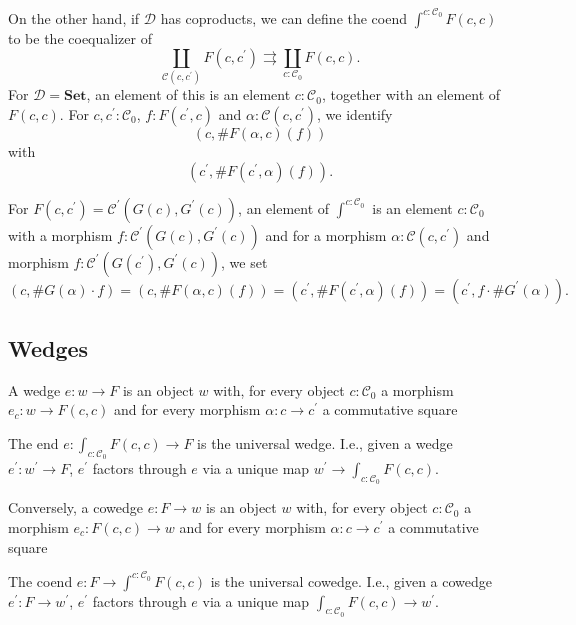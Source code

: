 \documentclass{amsbook}
\newcommand{\Catc}[1]{\mathcal{#1}}
\newcommand{\CC}{\Catc{C}}
\newcommand{\DD}{\Catc{D}}
\newcommand{\Catb}[1]{\mathbf{#1}}
\newcommand{\SET}{\Catb{Set}}
\newcommand{\Ob}[1]{{#1}_0}
\newcommand{\Hom}[3]{{#1}\left(#2,#3\right)}
\theoremstyle{definition}
\begin{document}
  On the other hand, if $ \DD $ has coproducts, we can define the coend $ \int^{c: \Ob \CC} F(c, c) $ to be the coequalizer of
  \[ \coprod_{\Hom{\CC} c {c^\prime}} F(c, c^\prime) \rightrightarrows \coprod_{c : \Ob \CC} F(c, c). \]
  For $ \DD = \SET $, an element of this is an element $ c : \Ob \CC $, together with an element of $ F(c, c) $.
  For $ c, c^\prime : \Ob \CC $, $ f : F(c^\prime, c) $ and $ \alpha : \Hom{\CC}{c}{c^\prime} $, we identify
  \[ (c, \#F(\alpha, c)(f)) \]
  with
  \[ (c^\prime, \#F(c^\prime, \alpha)(f)). \]

  For $ F(c, c^\prime) = \Hom{\CC^\prime}{G(c)}{G^\prime(c)} $, an element of $ \int^{c: \Ob \CC} $ is an element $ c : \Ob \CC $ with a morphism $ f : \Hom{\CC^\prime}{G(c)}{G^\prime(c)} $ and for a morphism $ \alpha : \Hom{\CC}{c}{c^\prime} $ and morphism $ f : \Hom{\CC^\prime}{G(c^\prime)}{G^\prime(c)} $, we set
  \[ (c, \#G(\alpha) \cdotp f) = (c, \#F(\alpha, c)(f)) = (c^\prime, \#F(c^\prime, \alpha)(f)) = (c^\prime, f \cdotp \#G^\prime(\alpha)). \]

  \subsection{Wedges}
  A wedge $ e : w \to F $ is an object $ w $ with, for every object $ c : \Ob \CC $ a morphism $ e_c : w \to F(c, c) $ and for every morphism $ \alpha: c \to c^\prime $ a commutative square
  \begin{center}
  \end{center}
  The end $ e : \int_{c: \Ob \CC} F(c, c) \to F $ is the universal wedge. I.e., given a wedge $ e^\prime : w^\prime \to F $, $ e^\prime $ factors through $ e $ via a unique map $ w^\prime \to \int_{c: \Ob \CC} F(c, c) $.

  Conversely, a cowedge $ e : F \to w $ is an object $ w $ with, for every object $ c : \Ob \CC $ a morphism $ e_c : F(c, c) \to w $ and for every morphism $ \alpha: c \to c^\prime $ a commutative square
  \begin{center}
  \end{center}
  The coend $ e : F \to \int^{c: \Ob \CC} F(c, c) $ is the universal cowedge. I.e., given a cowedge $ e^\prime : F \to w^\prime $, $ e^\prime $ factors through $ e $ via a unique map $ \int_{c: \Ob \CC} F(c, c) \to w^\prime $.
\end{document}
